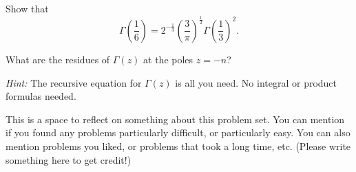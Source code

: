 \begin{problem}
  Show that
  \[\Gamma \left( \frac16 \right)=2^{-\frac13}\left( \frac3{\pi} \right)^{\frac12}\Gamma\left( \frac 13 \right)^2.\]
\end{problem}

\begin{problem}
  What are the residues of $\Gamma(z)$ at the poles $z=-n$?

  \emph{Hint:} The recursive equation for $\Gamma(z)$ is all you need. No integral or product formulas needed.
\end{problem}

\begin{problem}
  This is a space to reflect on something about this problem set. You can mention if you found any problems particularly difficult, or particularly easy. You can also mention problems you liked, or problems that took a long time, etc. (Please write something here to get credit!)
\end{problem}

